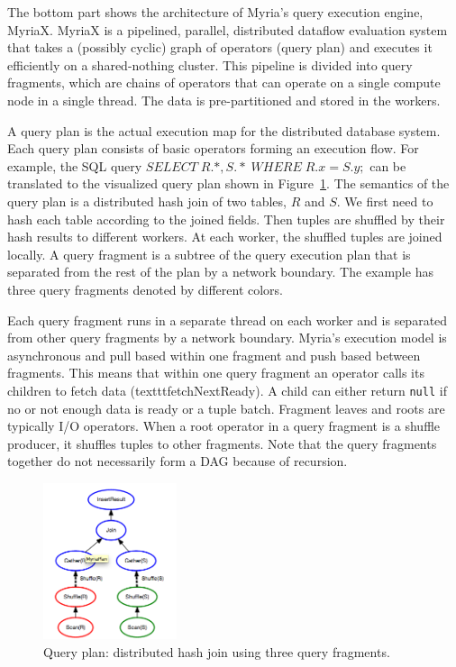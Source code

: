 \documentclass[11pt]{scrartcl}
\begin{document}
The bottom part shows the architecture of Myria’s query execution engine, MyriaX. MyriaX is a pipelined, parallel, distributed dataflow evaluation system that takes a (possibly cyclic) graph of operators (query plan) and executes it efficiently on a shared-nothing cluster. This pipeline is divided into query fragments, which are chains of operators that can operate on a single compute node in a single thread. The data is pre-partitioned and stored in the workers.

A query plan is the actual execution map for the distributed database system.  Each query plan consists of basic operators forming an execution flow. For example, the SQL query $SELECT \; R.*, S.*  \; WHERE \; R.x=S.y ;$ can be translated to the visualized query plan shown in Figure~\ref{fig:query_plan}. The semantics of the query plan is a distributed hash join of two tables, $R$ and $S$. We first need to hash each table according to the joined fields. Then tuples are shuffled by their hash results to different workers. At each worker, the shuffled tuples are joined locally. A query fragment is a subtree of the query execution plan that is separated from the rest of the plan by a network boundary. The example has three query fragments denoted by different colors.

Each query fragment runs in a separate thread on each worker and is separated from other query fragments by a network boundary. Myria's execution model is asynchronous and pull based within one fragment and push based between fragments. This means that within one query fragment an operator calls its children to fetch data (texttt{fetchNextReady}). A child can either return \texttt{null} if no or not enough data is ready or a tuple batch. Fragment leaves and roots are typically I/O operators. When a root operator in a query fragment is a shuffle producer, it shuffles tuples to other fragments. Note that the query fragments together do not necessarily form a DAG because of recursion.

\begin{figure}
 \begin{center}
     \includegraphics[width=0.35\textwidth]{partition_join.png}
   \end{center}
  \caption{Query plan: distributed hash join using three query fragments.}
  \label{fig:query_plan}
\end{figure}
\end{document}
